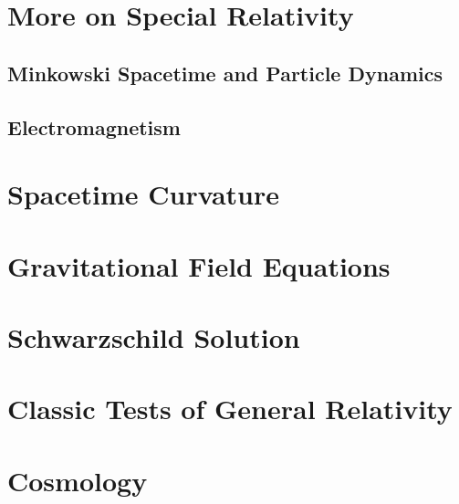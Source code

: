 \documentclass[a4paper]{article}
\theoremstyle{new}
\begin{document}
\section{More on Special Relativity}
\subsection{Minkowski Spacetime and Particle Dynamics}
\newpage
\subsection{Electromagnetism}
\newpage
\section{Spacetime Curvature}
\newpage
\section{Gravitational Field Equations}
\newpage
\section{Schwarzschild Solution}
\newpage
\section{Classic Tests of General Relativity}
\newpage
\section{Cosmology}
\end{document}
